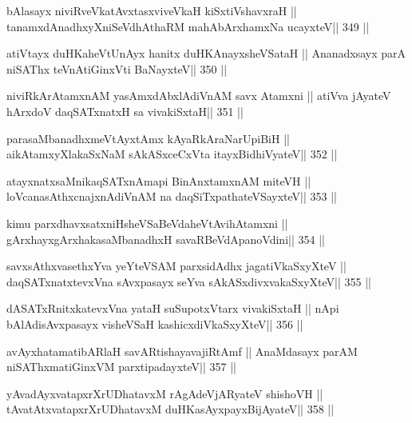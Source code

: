 \begin{shl}
bAlasayx niviRveVkatAvxtasxviveVkaH kiSxtiVshavxraH ||
tanamxdAnadhxyXniSeVdhAthaRM mahAbArxhamxNa ucayxteV\hfill || 349 ||
\end{shl}

\begin{shl}
atiVtayx duHKaheVtUnAyx hanitx duHKAnayxsheVSataH ||
Ananadxsayx parA niSAThx teVnAtiGinxVti BaNayxteV\hfill || 350 ||
\end{shl}

\begin{shl}
niviRkArAtamxnAM yasAmxdAbxlAdiVnAM savx Atamxni ||
atiVva jAyateV hArxdoV daqSATxnatxH sa vivakiSxtaH\hfill || 351 ||
\end{shl}

\begin{shl}
parasaMbanadhxmeVtAyxtAmx kAyaRkAraNarUpiBiH ||
aikAtamxyXlakaSxNaM sAkASxceCxVta itayxBidhiVyateV\hfill || 352 ||
\end{shl}

\begin{shl}
atayxnatxsaMnikaqSATxnAmapi BinAnxtamxnAM miteVH ||
loVcanasAthxcnajxnAdiVnAM na daqSiTxpathateVSayxteV\hfill || 353 ||
\end{shl}

\begin{shl}
kimu parxdhavxsatxniHsheVSaBeVdaheVtAvihA\s\s tamxni ||
gArxhayxgArxhakasaMbanadhxH savaRBeVdApanoVdini\hfill || 354 ||
\end{shl}

\begin{shl}
savxsAthxvasethxYva yeYteVSAM parxsidAdhx jagatiVkaSxyXteV ||
daqSATxnatxtevxVna sAvxpasayx seYva sAkASxdivxvakaSxyXteV\hfill || 355 ||
\end{shl}

\begin{shl}
dASATxRnitxkatevxVna yataH suSupotxV\s tarx vivakiSxtaH ||
nApi bAlAdisAvxpasayx visheVSaH kashicxdiVkaSxyXteV\hfill || 356 ||
\end{shl}

\begin{shl}
avAyxhatamatibARlaH savARtishayavajiRtAmf ||
AnaMdasayx parAM niSAThxmatiGinxVM parxtipadayxteV\hfill || 357 ||
\end{shl}

\begin{shl}
yAvadAyxvatapxrXrUDhatavxM rAgAdeVjARyateV shishoVH ||
tAvatAtxvatapxrXrUDhatavxM duHKasAyxpayxBijAyateV\hfill || 358 ||
\end{shl}

